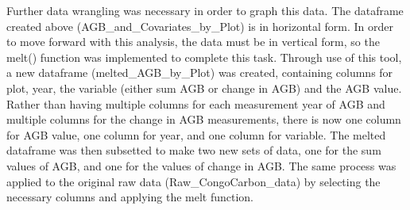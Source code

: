 \documentclass[12pt,]{article}
\newenvironment{Shaded}{\begin{snugshade}}{\end{snugshade}}
\newcommand{\CommentTok}[1]{\textcolor[rgb]{0.56,0.35,0.01}{\textit{#1}}}
\newcommand{\DataTypeTok}[1]{\textcolor[rgb]{0.13,0.29,0.53}{#1}}
\newcommand{\KeywordTok}[1]{\textcolor[rgb]{0.13,0.29,0.53}{\textbf{#1}}}
\newcommand{\NormalTok}[1]{#1}
\newcommand{\OperatorTok}[1]{\textcolor[rgb]{0.81,0.36,0.00}{\textbf{#1}}}
\newcommand{\OtherTok}[1]{\textcolor[rgb]{0.56,0.35,0.01}{#1}}
\newcommand{\StringTok}[1]{\textcolor[rgb]{0.31,0.60,0.02}{#1}}
\begin{document}
\begin{Shaded}
\end{Shaded}

Further data wrangling was necessary in order to graph this data. The
dataframe created above (AGB\_and\_Covariates\_by\_Plot) is in
horizontal form. In order to move forward with this analysis, the data
must be in vertical form, so the melt() function was implemented to
complete this task. Through use of this tool, a new dataframe
(melted\_AGB\_by\_Plot) was created, containing columns for plot, year,
the variable (either sum AGB or change in AGB) and the AGB value. Rather
than having multiple columns for each measurement year of AGB and
multiple columns for the change in AGB measurements, there is now one
column for AGB value, one column for year, and one column for variable.
The melted dataframe was then subsetted to make two new sets of data,
one for the sum values of AGB, and one for the values of change in AGB.
The same process was applied to the original raw data
(Raw\_CongoCarbon\_data) by selecting the necessary columns and applying
the melt function.
\end{document}
